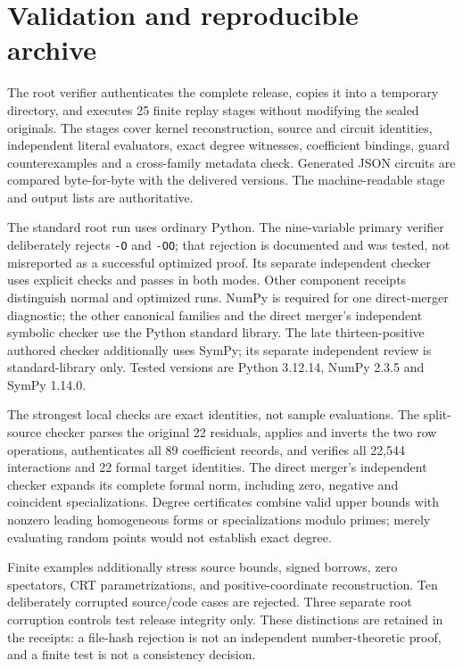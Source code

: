 \section{Validation and reproducible archive}
The root verifier authenticates the complete release, copies it into a
temporary directory, and executes 25 finite replay stages without modifying
the sealed originals. The stages cover kernel reconstruction, source and
circuit identities, independent literal evaluators, exact degree witnesses,
coefficient bindings, guard counterexamples and a cross-family metadata
check. Generated JSON circuits are compared byte-for-byte with the delivered
versions. The machine-readable stage and output lists are authoritative.

The standard root run uses ordinary Python. The nine-variable primary
verifier deliberately rejects \texttt{-O} and \texttt{-OO}; that rejection
is documented and was tested, not misreported as a successful optimized
proof. Its separate independent checker uses explicit checks and passes in
both modes. Other component receipts distinguish normal and optimized
runs. NumPy is required for one direct-merger diagnostic; the other canonical
families and the direct merger's independent symbolic checker use the Python
standard library. The late thirteen-positive authored checker additionally
uses SymPy; its separate independent review is standard-library only.
Tested versions are Python 3.12.14, NumPy 2.3.5 and SymPy 1.14.0.

The strongest local checks are exact identities, not sample evaluations.
The split-source checker parses the original 22 residuals, applies and
inverts the two row operations, authenticates all 89 coefficient records,
and verifies all 22,544 interactions and 22 formal target identities.
The direct merger's independent checker expands its complete formal norm,
including zero, negative and coincident specializations. Degree certificates
combine valid upper bounds with nonzero leading homogeneous forms or
specializations modulo primes; merely evaluating random points would not
establish exact degree.

Finite examples additionally stress source bounds, signed borrows, zero
spectators, CRT parametrizations, and positive-coordinate reconstruction.
Ten deliberately corrupted source/code cases are rejected. Three separate
root corruption controls test release integrity only. These distinctions
are retained in the receipts: a file-hash rejection is not an independent
number-theoretic proof, and a finite test is not a consistency decision.

